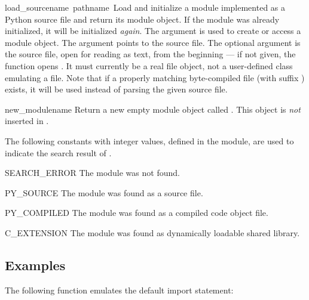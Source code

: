 \begin{funcdesc}{load_source}{name\, pathname\, }
Load and initialize a module implemented as a Python source file and
return its module object.  If the module was already initialized, it
will be initialized {\em again}.  The  argument is used to
create or access a module object.  The  argument points
to the source file.  The optional  argument is the source
file, open for reading as text, from the beginning --- if not given,
the function opens .  It must currently be a real file
object, not a user-defined class emulating a file.  Note that if a
properly matching byte-compiled file (with suffix ) exists,
it will be used instead of parsing the given source file.
\end{funcdesc}

\begin{funcdesc}{new_module}{name}
Return a new empty module object called .  This object is
{\em not} inserted in .
\end{funcdesc}

The following constants with integer values, defined in the module,
are used to indicate the search result of .

\begin{datadesc}{SEARCH_ERROR}
The module was not found.
\end{datadesc}

\begin{datadesc}{PY_SOURCE}
The module was found as a source file.
\end{datadesc}

\begin{datadesc}{PY_COMPILED}
The module was found as a compiled code object file.
\end{datadesc}

\begin{datadesc}{C_EXTENSION}
The module was found as dynamically loadable shared library.
\end{datadesc}

\subsection{Examples}
The following function emulates the default import statement:

